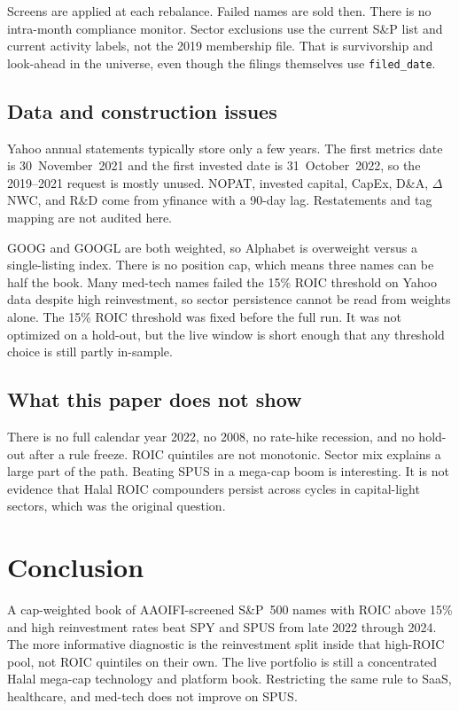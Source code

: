 \documentclass[11pt,letterpaper]{article}
\begin{document}
Screens are applied at each rebalance. Failed names are sold then. There is no intra-month compliance monitor. Sector exclusions use the current S\&P list and current activity labels, not the 2019 membership file. That is survivorship and look-ahead in the universe, even though the filings themselves use \texttt{filed\_date}.

\subsection{Data and construction issues}

Yahoo annual statements typically store only a few years. The first metrics date is 30~November~2021 and the first invested date is 31~October~2022, so the 2019--2021 request is mostly unused. NOPAT, invested capital, CapEx, D\&A, $\Delta$NWC, and R\&D come from yfinance with a 90-day lag. Restatements and tag mapping are not audited here.

GOOG and GOOGL are both weighted, so Alphabet is overweight versus a single-listing index. There is no position cap, which means three names can be half the book. Many med-tech names failed the 15\% ROIC threshold on Yahoo data despite high reinvestment, so sector persistence cannot be read from weights alone. The 15\% ROIC threshold was fixed before the full run. It was not optimized on a hold-out, but the live window is short enough that any threshold choice is still partly in-sample.

\subsection{What this paper does not show}

There is no full calendar year 2022, no 2008, no rate-hike recession, and no hold-out after a rule freeze. ROIC quintiles are not monotonic. Sector mix explains a large part of the path. Beating SPUS in a mega-cap boom is interesting. It is not evidence that Halal ROIC compounders persist across cycles in capital-light sectors, which was the original question.

\section{Conclusion}
\label{sec:conc}

A cap-weighted book of AAOIFI-screened S\&P~500 names with ROIC above 15\% and high reinvestment rates beat SPY and SPUS from late 2022 through 2024. The more informative diagnostic is the reinvestment split inside that high-ROIC pool, not ROIC quintiles on their own. The live portfolio is still a concentrated Halal mega-cap technology and platform book. Restricting the same rule to SaaS, healthcare, and med-tech does not improve on SPUS.
\end{document}
